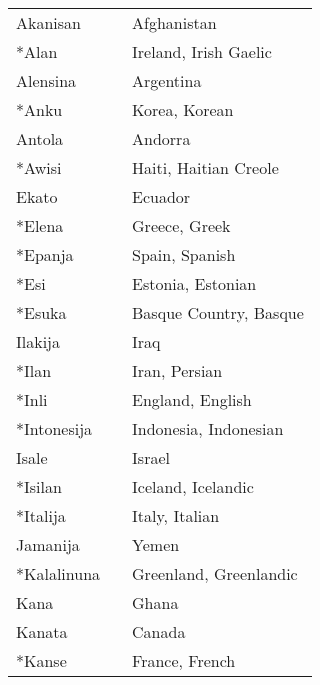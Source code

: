 \begin{supertabular}{p{4,5cm}|ll}
    Akanisan                   &  & Afghanistan                     \\
    *Alan                      &  & Ireland, Irish Gaelic           \\
    Alensina                   &  & Argentina                       \\
    *Anku                      &  & Korea, Korean                   \\
    Antola                     &  & Andorra                         \\
    *Awisi                     &  & Haiti, Haitian Creole           \\
    Ekato                      &  & Ecuador                         \\
    *Elena                     &  & Greece, Greek                   \\
    *Epanja                    &  & Spain, Spanish                  \\
    *Esi                       &  & Estonia, Estonian               \\
    *Esuka                     &  & Basque Country, Basque          \\
    Ilakija                    &  & Iraq                            \\
    *Ilan                      &  & Iran, Persian                   \\
    *Inli                      &  & England, English                \\
    *Intonesija                &  & Indonesia, Indonesian           \\
    Isale                      &  & Israel                          \\
    *Isilan                    &  & Iceland, Icelandic              \\
    *Italija                   &  & Italy, Italian                  \\
    Jamanija                   &  & Yemen                           \\
    *Kalalinuna                &  & Greenland, Greenlandic          \\
    Kana                       &  & Ghana                           \\
    Kanata                     &  & Canada                          \\
    *Kanse                     &  & France, French                  \\

\end{supertabular}
